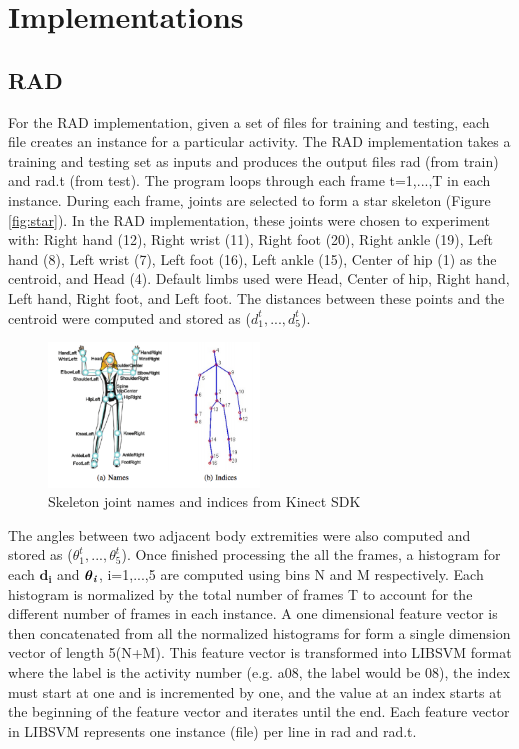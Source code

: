 \documentclass[11pt,nocopyrightspace]{config}
\begin{document}
\section{Implementations}
\subsection{RAD}

For the RAD implementation, given a set of files for training and testing, each file creates an instance for a particular activity. The RAD implementation takes a training and testing set as inputs and produces the output files rad (from train) and rad.t (from test). The program loops through each frame t=1,...,T in each instance. During each frame, joints are selected to form a star skeleton (Figure \ref{fig:star}). In the RAD implementation, these joints were chosen to experiment with: Right hand (12), Right wrist (11), Right foot (20), Right ankle (19), Left hand (8), Left wrist (7), Left foot (16), Left ankle (15), Center of hip (1) as the centroid,  and Head (4). Default limbs used were Head, Center of hip, Right hand, Left hand, Right foot, and Left foot. The distances between these points and the centroid were computed and stored as ($d_1^t,...,d_5^t$). 

\begin{figure}
	\centering
	\includegraphics[width=0.5\textwidth]{skeleton_joint_names_indicies}
	\caption{Skeleton joint names and indices from Kinect SDK}
	\label{fig:kinect_sdk}
\end{figure}

The angles between two adjacent body extremities were also computed and stored as ($\theta_1^t,...,\theta_5^t$). Once finished processing the all the frames, a histogram for each \emph{$\textbf{d}_\textbf{i}$} and $ \boldsymbol\theta_\textbf{\emph{i}}$, i=1,...,5 are computed using bins N and M respectively. Each histogram is normalized by the total number of frames T to account for the different number of frames in each instance. A one dimensional feature vector is then concatenated from all the normalized histograms for form a single dimension vector of length 5(N+M). This feature vector is transformed into LIBSVM format where the label is the activity number (e.g. a08, the label would be 08), the index must start at one and is incremented by one, and the value at an index starts at the beginning of the feature vector and iterates until the end. Each feature vector in LIBSVM represents one instance (file) per line in rad and rad.t.
\end{document}
